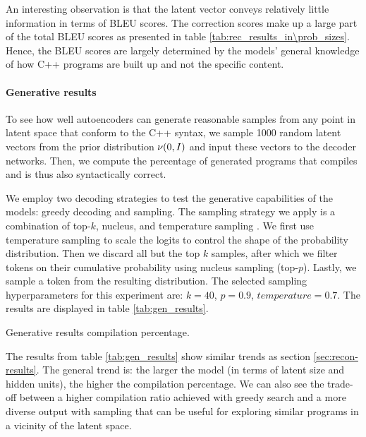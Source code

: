 An interesting observation is that the latent vector conveys relatively little information in terms of BLEU scores. The correction scores make up a large part of the total BLEU scores as presented in table \ref{tab:rec_results_in\prob_sizes}. Hence, the BLEU scores are largely determined by the models' general knowledge of how C++ programs are built up and not the specific content.

\paragraph{Generative results}
\label{results:gen}
To see how well autoencoders can generate reasonable samples from any point in latent space that conform to the C++ syntax, we sample 1000 random latent vectors from the prior distribution $\nu(0, I)$ and input these vectors to the decoder networks. Then, we compute the percentage of generated programs that compiles and is thus also syntactically correct.



We employ two decoding strategies to test the generative capabilities of the models: greedy decoding and sampling. The sampling strategy we apply is a combination of top-$k$, nucleus, and temperature sampling \cite{holtzman2019curious}. 
We first use temperature sampling to scale the logits to control the shape of the probability distribution. Then we discard all but the top $k$ samples, after which we filter tokens on their cumulative probability using nucleus sampling (top-$p$). Lastly, we sample a token from the resulting distribution. The selected sampling hyperparameters for this experiment are: $k=40$, $p=0.9$, $temperature=0.7$. The results are displayed in table \ref{tab:gen_results}.

\begin{table}
\centering

\caption{Generative results compilation percentage.}
\label{tab:gen_results}
\end{table}




The results from table \ref{tab:gen_results} show similar trends as section \ref{sec:recon-results}. 
The general trend is: the larger the model (in terms of latent size and hidden units), the higher the compilation percentage. 
We can also see the trade-off between a higher compilation ratio achieved with greedy search and a more diverse output with sampling that can be useful for exploring similar programs in a vicinity of the latent space.

